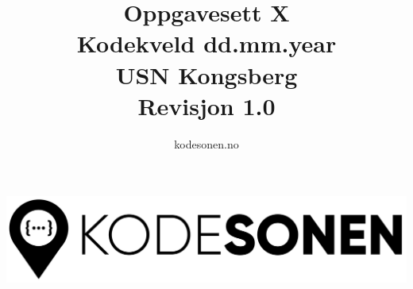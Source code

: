 \documentclass{article}
\title{
    \textbf{Oppgavesett X}\\
    Kodekveld dd.mm.year\\[1.5cm]
    \textbf{USN Kongsberg}\\
    Revisjon 1.0
}
\author{kodesonen.no}
\date{}
\begin{document}
\vspace*{1.5cm}
\begin{center}\includegraphics[width=15cm]{img/essential/logo.png}\end{center}
{\let\newpage\relax\maketitle}
\newpage
{}
\renewcommand{\contentsname}{Innholdsfortegnelse}
\tableofcontents\newpage





\end{document}
